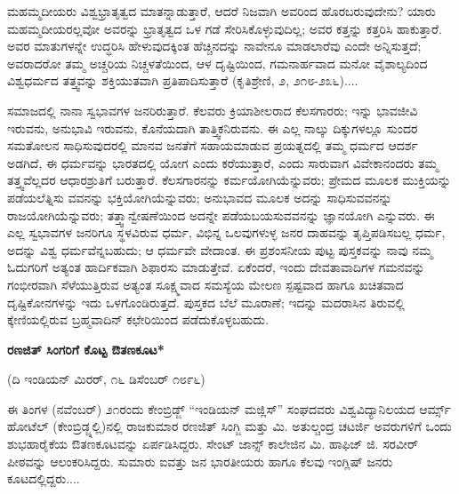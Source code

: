 ಮಹಮ್ಮದೀಯರು ವಿಶ್ವಭ್ರಾತೃತ್ವದ ಮಾತನ್ನಾಡುತ್ತಾರೆ, ಆದರೆ ನಿಜವಾಗಿ ಅವರಿಂದ ಹೊರಬರುವುದೇನು? ಯಾರು ಮಹಮ್ಮದೀಯರಲ್ಲವೋ ಅವರನ್ನು ಭ್ರಾತೃತ್ವದ ಒಳ ಗಡೆ ಸೇರಿಸಿಕೊಳ್ಳುವುದಿಲ್ಲ; ಅವರ ಕತ್ತನ್ನು ಕತ್ತರಿಸಿ ಹಾಕುತ್ತಾರೆ. ಅವರ ಮಾತುಗಳನ್ನೇ ಉದ್ಧರಿಸಿ ಹೇಳುವುದಕ್ಕಿಂತ ಹೆಚ್ಚಿನದನ್ನು ನಾವೇನೂ ಮಾಡಲಾರೆವು ಎಂದೇ ಅನ್ನಿಸುತ್ತದೆ; ಅವರಾದರೋ ತಮ್ಮ ಅಚ್ಚರಿಯ ನಿಚ್ಚಳತೆಯಿಂದ, ಆಳ ದೃಷ್ಟಿಯಿಂದ, ಗಮನಾರ್ಹವಾದ ಮನೋ ವೈಶಾಲ್ಯದಿಂದ ವಿಶ್ವಧರ್ಮದ ತತ್ತ್ವವನ್ನು ಶಕ್ತಿಯುತವಾಗಿ ಪ್ರತಿಪಾದಿಸುತ್ತಾರೆ (ಕೃತಿಶ್ರೇಣಿ, ೨, ೨೧೮-೨೩೬)....

ಸಮಾಜದಲ್ಲಿ ನಾನಾ ಸ್ವಭಾವಗಳ ಜನರಿರುತ್ತಾರೆ. ಕೆಲವರು ಕ್ರಿಯಾಶೀಲರಾದ ಕೆಲಸಗಾರರು; ಇನ್ನು ಭಾವಜೀವಿ ಇರುವನು, ಅನುಭಾವಿ ಇರುವನು, ಕೊನೆಯದಾಗಿ ತಾತ್ತ್ವಿಕನಿರುವನು. ಈ ಎಲ್ಲ ನಾಲ್ಕು ದಿಕ್ಕುಗಳಲ್ಲೂ ಸುಂದರ ಸಮತೋಲನ ಸಾಧಿಸುವುದರಲ್ಲಿ ಮಾನವ ಜನತೆಗೆ ಸಹಾಯಮಾಡುವ ಪ್ರಯತ್ನದಲ್ಲಿ ತಮ್ಮ ಧರ್ಮದ ಆದರ್ಶ ಅಡಗಿದೆ, ಈ ಧರ್ಮವನ್ನು ಭಾರತದಲ್ಲಿ ಯೋಗ ಎಂದು ಕರೆಯುತ್ತಾರೆ, ಎಂದು ಸಾರುವಾಗ ವಿವೇಕಾನಂದರು ತಮ್ಮ ತತ್ತ್ವವೆಲ್ಲದರ ಆಧಾರಶ್ರುತಿಗೆ ಬರುತ್ತಾರೆ. ಕೆಲಸಗಾರನನ್ನು ಕರ್ಮಯೋಗಿಯೆನ್ನುವರು; ಪ್ರೇಮದ ಮೂಲಕ ಮುಕ್ತಿಯನ್ನು ಪಡೆಯಲೆತ್ನಿಸು ವವನನ್ನು ಭಕ್ತಿಯೋಗಿಯೆನ್ನುವರು; ಅನುಭಾವದ ಮೂಲಕ ಅದನ್ನು ಸಾಧಿಸುವವನನ್ನು ರಾಜಯೋಗಿಯೆನ್ನುವರು; ತತ್ತ್ವಾನ್ವೇಷಣೆಯಿಂದ ಅದನ್ನೇ ಪಡೆಯಬಯಸುವವನನ್ನು ಜ್ಞಾನಯೋಗಿ ಎನ್ನುವರು. ಈ ಎಲ್ಲ ಸ್ವಭಾವಗಳ ಜನರಿಗೂ ಸ್ಥಳವಿರುವ ಧರ್ಮ, ವಿಭಿನ್ನ ಒಲವುಗಳುಳ್ಳ ಜನರ ದಾಹವನ್ನು ತೃಪ್ತಿಪಡಿಸಬಲ್ಲ ಧರ್ಮ, ಅದನ್ನು ವಿಶ್ವ ಧರ್ಮವೆನ್ನಬಹುದು; ಆ ಧರ್ಮವೇ ವೇದಾಂತ. ಈ ಪ್ರಶಂಸನೀಯ ಪುಟ್ಟ ಪುಸ್ತಕವನ್ನು ನಾವು ನಮ್ಮ ಓದುಗರಿಗೆ ಅತ್ಯಂತ ಹಾರ್ದಿಕವಾಗಿ ಶಿಫಾರಸು ಮಾಡುತ್ತೇವೆ. ಏಕೆಂದರೆ, ಇಂದು ದೇವತಾವಾದಿಗಳ ಗಮನವನ್ನು ಗಂಭೀರವಾಗಿ ಸೆಳೆಯುತ್ತಿರುವ ಅತ್ಯಂತ ಸೂಕ್ಷ್ಮವಾದ ಸಮಸ್ಯೆಯ ಮೇಲಣ ಸ್ಪಷ್ಟವಾದ ಹಾಗೂ ಖಚಿತವಾದ ದೃಷ್ಟಿಕೋನಗಳನ್ನು ಇದು ಒಳಗೊಂಡಿರುತ್ತದೆ. ಪುಸ್ತಕದ ಬೆಲೆ ಮೂರಾಣೆ; ಇದನ್ನು ಮದರಾಸಿನ ತಿರುವಲ್ಲಿ ಕ್ಕೇಣಿಯಲ್ಲಿರುವ ಬ್ರಹ್ಮವಾದಿನ್ ಕಛೇರಿಯಿಂದ ಪಡೆದುಕೊಳ್ಳಬಹುದು.

\begin{center}
\textbf{ರಣಜಿತ್ ಸಿಂಗರಿಗೆ ಕೊಟ್ಟ ಔತಣಕೂಟ*}
\end{center}

\begin{center}
(ದಿ ಇಂಡಿಯನ್ ಮಿರರ್, ೧೬ ಡಿಸೆಂಬರ್ ೧೮೯೬)
\end{center}

ಈ ತಿಂಗಳ (ನವೆಂಬರ್) ೨೧ರಂದು ಕೇಂಬ್ರಿಡ್ಜ್ “ಇಂಡಿಯನ್ ಮಜ್ಲಿಸ್” ಸಂಘದವರು ವಿಶ್ವವಿದ್ಯಾನಿಲಯದ ಆರ್ಮ್ಸ್ ಹೋಟೆಲ್ (ಕೇಂಬ್ರಿಡ್ಜ್ನಲ್ಲಿ)ನಲ್ಲಿ ರಾಜಕುಮಾರ ರಣಜಿತ್ ಸಿಂಗ್ಜಿ ಮತ್ತು ಮಿ. ಅತುಲ್ಚಂದ್ರ ಚಟರ್ಜಿ ಅವರುಗಳಿಗೆ ಒಂದು ಶುಭಹಾರೈಕೆಯ ಔತಣಕೂಟವನ್ನು ಏರ್ಪಡಿಸಿದ್ದರು. ಸೇಂಟ್ ಜಾನ್ಸ್ ಕಾಲೇಜಿನ ಮಿ. ಹಾಫಿಜ್ ಜಿ. ಸರವೀರ್ ಪೀಠವನ್ನು ಆಲಂಕರಿಸಿದ್ದರು. ಸುಮಾರು ಐವತ್ತು ಜನ ಭಾರತೀಯರು ಹಾಗೂ ಕೆಲವು ಇಂಗ್ಲಿಷ್ ಜನರು ಕೂಟದಲ್ಲಿದ್ದರು....

